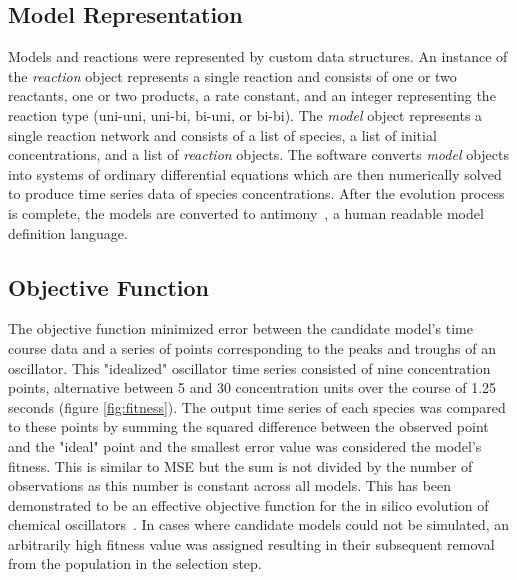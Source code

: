 \documentclass[12pt]{report}
\begin{document}
\subsection{Model Representation}

Models and reactions were represented by custom data structures. An instance of the \textit{reaction} object represents a single reaction and consists of one or two reactants, one or two products, a rate constant, and an integer representing the reaction type (uni-uni, uni-bi, bi-uni, or bi-bi). The \textit{model} object represents a single reaction network and consists of a list of species, a list of initial concentrations, and a list of \textit{reaction} objects. The software converts \textit{model} objects into systems of ordinary differential equations which are then numerically solved to produce time series data of species concentrations. After the evolution process is complete, the models are converted to antimony~\cite{Smith2009}, a human readable model definition language.

\subsection{Objective Function}

The objective function minimized error between the candidate model's time course data and a series of points corresponding to the peaks and troughs of an oscillator. This "idealized" oscillator time series consisted of nine concentration points, alternative between 5 and 30 concentration units over the course of 1.25 seconds (figure \ref{fig:fitness}). The output time series of each species was compared to these points by summing the squared difference between the observed point and the "ideal" point and the smallest error value was considered the model's fitness. This is similar to MSE but the sum is not divided by the number of observations as this number is constant across all models. This has been demonstrated to be an effective objective function for the in silico evolution of chemical oscillators~\cite{Paladugu2006}.  In cases where candidate models could not be simulated, an arbitrarily high fitness value was assigned resulting in their subsequent removal from the population in the selection step.  
\end{document}

